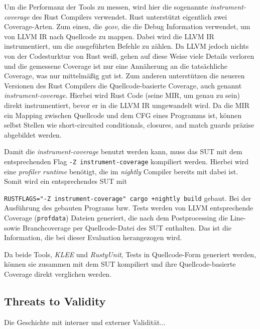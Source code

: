 \documentclass{article}
\begin{document}
Um die Performanz der Tools zu messen, wird hier die sogenannte \textit{instrument-coverage} des Rust Compilers verwendet. Rust unterstützt eigentlich zwei Coverage-Arten. Zum einen, die \textit{gcov}, die die Debug Information verwendet, um von LLVM IR nach Quellcode zu mappen. Dabei wird die LLVM IR instrumentiert, um die ausgeführten Befehle zu zählen. Da LLVM jedoch nichts von der Codesturktur von Rust weiß, gehen auf diese Weise viele Details verloren und die gemessene Coverage ist nur eine Annäherung an die tatsächliche Coverage, was nur mittelmäßig gut ist. Zum anderen unterstützen die neueren Versionen des Rust Compilers die Quellcode-basierte Coverage, auch genannt \textit{instrument-coverage}. Hierbei wird Rust Code (seine MIR, um genau zu sein) direkt instrumentiert, bevor er in die LLVM IR umgewandelt wird. Da die MIR ein Mapping zwischen Quellcode und dem CFG eines Programms ist, können selbst Stellen wie short-circuited conditionals, closures, and match guards präzise abgebildet werden.

Damit die \textit{instrument-coverage} benutzt werden kann, muss das SUT mit dem entsprechenden Flag \lstinline{-Z instrument-coverage} kompiliert werden. Hierbei wird eine \textit{profiler runtime} benötigt, die im \textit{nightly} Compiler bereits mit dabei ist. Somit wird ein entsprechendes SUT mit \raggedright\lstinline{RUSTFLAGS="-Z instrument-coverage" cargo +nightly build} gebaut. Bei der Ausführung des gebauten Programs bzw. Tests werden von LLVM entsprechende Coverage (\lstinline{profdata}) Dateien generiert,  die nach dem Postprocessing die Line- sowie Branchcoverage per Quellcode-Datei des SUT enthalten. Das ist die Information, die bei dieser Evaluation herangezogen wird.

Da beide Tools, \textit{KLEE} und \textit{RustyUnit}, Tests in Quellcode-Form generiert werden, können sie zusammen mit dem SUT kompiliert und ihre Quellcode-basierte Coverage direkt verglichen werden.



\subsection{Threats to Validity}
Die Geschichte mit interner und externer Validität...
\end{document}
